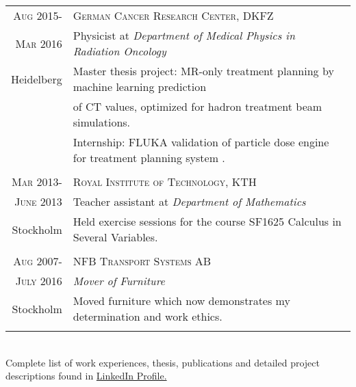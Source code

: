\documentclass[a4paper,10pt]{article}
\newcommand{\MYhref}[3][blue]{\href{#2}{\color{#1}{#3}}}%
\begin{document}
{\begin{tabular}{r|p{16cm}}

 
 
 
 
 
 
 \textsc{Aug} 2015- & \textsc{German Cancer Research Center, DKFZ} \\
 \textsc{Mar} 2016& Physicist at \emph{Department of Medical Physics in Radiation Oncology}\\
 Heidelberg &\footnotesize{ Master thesis project:  MR-only treatment planning by machine learning prediction } \\
 & \footnotesize{of CT values, optimized for hadron treatment beam simulations.} \\
 & \footnotesize{Internship: FLUKA validation of particle dose engine for treatment planning system \MYhref{ https://aapm.onlinelibrary.wiley.com/doi/abs/10.1002/mp.12251@10.1002/(ISSN)2473-4209.EDITORS_CHOICE}{matRad}.} \\
 \\

 
 \textsc{Mar} 2013- & \textsc{Royal Institute of Technology, KTH}\\
 \textsc{June} 2013 &Teacher assistant at \emph{Department of Mathematics}\\
 Stockholm&\footnotesize{Held exercise sessions for the course SF1625 Calculus in Several Variables. }\\ \\
 
 
 
\textsc{Aug} 2007- & \textsc{NFB Transport Systems AB}\\
 \textsc{July} 2016 & \emph{Mover of Furniture} \\
 
Stockholm & \footnotesize{Moved furniture which now demonstrates my determination and work ethics.} \\
  \\
\end{tabular}
\\
{\setlength\parindent{80pt} { \scriptsize Complete list of work experiences, thesis, publications and detailed project descriptions found in  \href{http://www.linkedin.com/in/danielbjorkman88}{LinkedIn Profile.}} }
 \\
}
\end{document}
